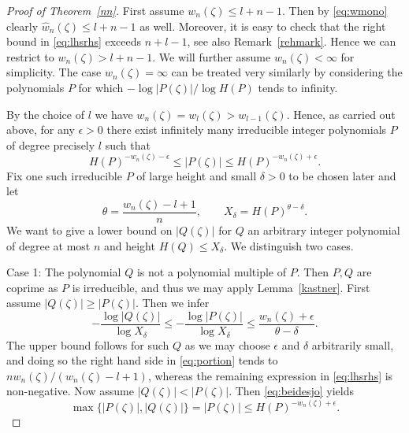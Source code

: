 \documentclass[12pt]{amsart}
\theoremstyle{definition}
\begin{document}
\begin{proof} [Proof of Theorem~\ref{nn}]
First assume $w_{n}(\zeta)\leq l+n-1$. Then by \eqref{eq:wmono} clearly $\widehat{w}_{n}(\zeta)\leq l+n-1$ as well.
Moreover, it is easy to check that the right bound in \eqref{eq:lhsrhs} exceeds $n+l-1$, see also Remark~\ref{rehmark}. Hence we can restrict to $w_{n}(\zeta)>l+n-1$.
We will further assume $w_{n}(\zeta)<\infty$ for simplicity. The case $w_{n}(\zeta)=\infty$
can be treated very similarly by considering the polynomials $P$ for which $-\log \vert P(\zeta)\vert/\log H(P)$
tends to infinity.
 
By the choice of $l$ we have $w_{n}(\zeta)=w_{l}(\zeta)>w_{l-1}(\zeta)$. Hence,
as carried out above, for any $\epsilon>0$ there exist infinitely many
irreducible integer polynomials $P$ of degree 
precisely $l$ such that  
\begin{equation} \label{eq:beidesjo}
H(P)^{-w_{n}(\zeta)-\epsilon} \leq \vert P(\zeta)\vert \leq H(P)^{-w_{n}(\zeta)+\epsilon}.
\end{equation}
Fix one such irreducible $P$ of large height and small $\delta>0$ to be chosen later and let
\begin{equation} \label{eq:theta}
\theta= \frac{w_{n}(\zeta)-l+1}{n}, \qquad X_{\delta}= H(P)^{\theta-\delta}.
\end{equation}
We want to give a lower bound on $\vert Q(\zeta)\vert$ for $Q$ an arbitrary integer polynomial
of degree at most $n$ and height $H(Q)\leq X_{\delta}$. We distinguish two cases.

Case 1: The polynomial $Q$ is not a polynomial multiple of $P$.
Then $P,Q$ are coprime as $P$ is irreducible, and thus we may apply Lemma~\ref{kastner}.
First assume $\vert Q(\zeta)\vert \geq \vert P(\zeta)\vert$.
Then we infer
\begin{equation} \label{eq:portion}
-\frac{\log \vert Q(\zeta)\vert}{\log X_{\delta}}\leq -\frac{\log \vert P(\zeta)\vert}{\log X_{\delta}}
\leq \frac{w_{n}(\zeta)+\epsilon}{\theta-\delta}.
\end{equation}
The upper bound follows for such $Q$ as we may choose $\epsilon$ and $\delta$ arbitrarily small,
and doing so the right hand side in \eqref{eq:portion} tends to $nw_{n}(\zeta)/(w_{n}(\zeta)-l+1)$,
whereas the remaining expression in \eqref{eq:lhsrhs} is non-negative.
Now assume $\vert Q(\zeta)\vert < \vert P(\zeta)\vert$.
Then \eqref{eq:beidesjo} yields
\begin{equation} \label{eq:verallg}
\max \{ \vert P(\zeta)\vert, \vert Q(\zeta)\vert \}= \vert P(\zeta)\vert \leq H(P)^{-w_{n}(\zeta)+\epsilon}.
\end{equation}


\end{proof}
\end{document}
